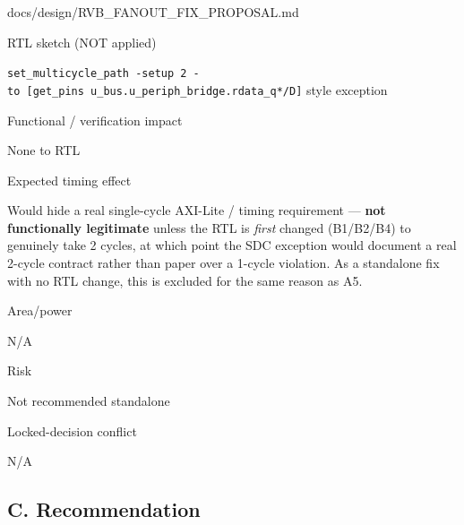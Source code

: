 \begin{relocated}{docs/design/RVB_FANOUT_FIX_PROPOSAL.md}
\begin{rowtable}
\begin{rowcell}{RTL sketch (NOT applied)}

\texttt{set\_\allowbreak{}multicycle\_\allowbreak{}path\ -\allowbreak{}setup\ 2\ -\allowbreak{}to\ [get\_\allowbreak{}pins\ u\_\allowbreak{}bus.\allowbreak{}u\_\allowbreak{}periph\_\allowbreak{}bridge.\allowbreak{}rdata\_\allowbreak{}q*/\allowbreak{}D]}
style exception

\end{rowcell}

\begin{rowcell}{Functional / verification impact}

None to RTL

\end{rowcell}

\begin{rowcell}{Expected timing effect}

Would hide a real single-cycle AXI-Lite /
timing requirement --- \textbf{not functionally legitimate} unless the
RTL is \emph{first} changed (B1/\allowbreak{}B2/\allowbreak{}B4) to
genuinely take 2 cycles, at which point the SDC exception would document
a real 2-cycle contract rather than paper over a 1-cycle violation. As a
standalone fix with no RTL change, this is excluded for the same reason
as A5.

\end{rowcell}

\begin{rowcell}{Area/\allowbreak{}power}

N/A

\end{rowcell}

\begin{rowcell}{Risk}

Not recommended standalone

\end{rowcell}

\begin{rowcell}{Locked-decision conflict}

N/A

\end{rowcell}

\end{rowtable}

\subsection{C. Recommendation}\label{tm:pd:rvb-fanout-fix:c-recommendation}


\end{relocated}
